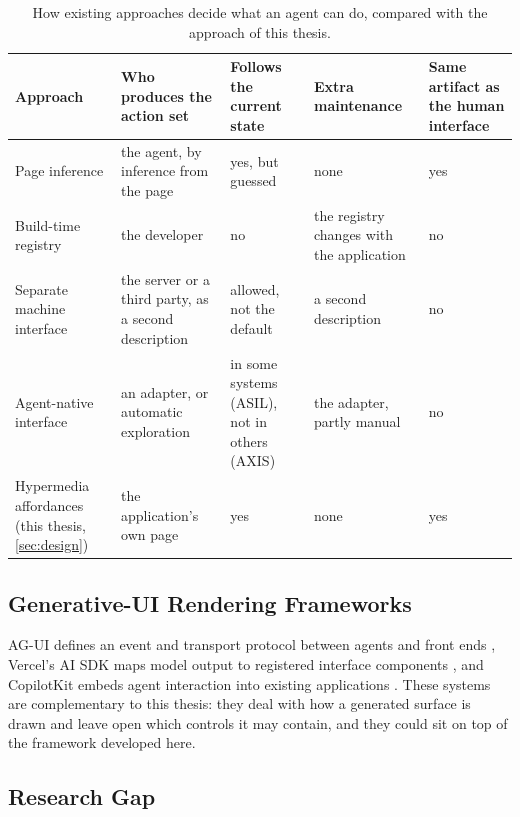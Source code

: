 \begin{table}[htbp]
\centering
\caption{How existing approaches decide what an agent can do, compared with the approach of this thesis.}
\label{tab:bg:comparison}
\renewcommand{\arraystretch}{1.3}
\begin{tabularx}{\textwidth}{P{0.2\textwidth}LLLP{0.13\textwidth}}
\hline
Approach & Who produces the action set & Follows the current state & Extra maintenance & Same artifact as the human interface \\
\hline
Page inference \cite{zhou2024webarena, mozannar2025magenticui} & the agent, by inference from the page & yes, but guessed & none & yes \\
\hline
Build-time registry \cite{aisdkGUI, leviathan2025generative} & the developer & no & the registry changes with the application & no \\
\hline
Separate machine interface \cite{mcpSpec2025, jiang2026web} & the server or a third party, as a second description & allowed, not the default & a second description & no \\
\hline
Agent-native interface \cite{xie2026asil, lu2025axis} & an adapter, or automatic exploration & in some systems (ASIL), not in others (AXIS) & the adapter, partly manual & no \\
\hline
Hypermedia affordances (this thesis, \autoref{sec:design}) & the application's own page & yes & none & yes \\
\hline
\end{tabularx}
\end{table}

\subsection{Generative-UI Rendering Frameworks}\label{sec:bg:rendering}

AG-UI defines an event and transport protocol between agents and front ends \cite{aguiOverview}, Vercel's AI SDK maps model output to registered interface components \cite{aisdkGUI}, and CopilotKit embeds agent interaction into existing applications \cite{copilotkitDocs}.
These systems are complementary to this thesis: they deal with how a generated surface is drawn and leave open which controls it may contain, and they could sit on top of the framework developed here.

\subsection{Research Gap}\label{sec:bg:gap}

